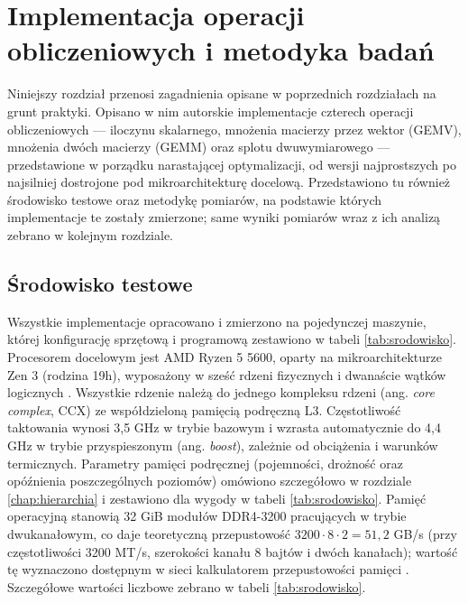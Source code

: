 \documentclass[a4paper,12pt]{book} %
\begin{document}
\chapter{Implementacja operacji obliczeniowych i metodyka badań}
\label{chap:implementacja}

Niniejszy rozdział przenosi zagadnienia opisane w poprzednich rozdziałach na grunt praktyki. Opisano w nim autorskie implementacje czterech operacji obliczeniowych --- iloczynu skalarnego, mnożenia macierzy przez wektor (GEMV), mnożenia dwóch macierzy (GEMM) oraz splotu dwuwymiarowego --- przedstawione w porządku narastającej optymalizacji, od wersji najprostszych po najsilniej dostrojone pod mikroarchitekturę docelową. Przedstawiono tu również środowisko testowe oraz metodykę pomiarów, na podstawie których implementacje te zostały zmierzone; same wyniki pomiarów wraz z ich analizą zebrano w kolejnym rozdziale.

\section{Środowisko testowe}
\label{sec:srodowisko}

Wszystkie implementacje opracowano i zmierzono na pojedynczej maszynie, której konfigurację sprzętową i programową zestawiono w tabeli \ref{tab:srodowisko}. Procesorem docelowym jest AMD Ryzen 5 5600, oparty na mikroarchitekturze Zen 3 (rodzina 19h), wyposażony w sześć rdzeni fizycznych i dwanaście wątków logicznych \cite{evers2022zen3}. Wszystkie rdzenie należą do jednego kompleksu rdzeni (ang. \emph{core complex}, CCX) ze współdzieloną pamięcią podręczną L3. Częstotliwość taktowania wynosi 3,5 GHz w trybie bazowym i wzrasta automatycznie do 4,4 GHz w trybie przyspieszonym (ang. \emph{boost}), zależnie od obciążenia i warunków termicznych. Parametry pamięci podręcznej (pojemności, drożność oraz opóźnienia poszczególnych poziomów) omówiono szczegółowo w rozdziale \ref{chap:hierarchia} i zestawiono dla wygody w tabeli \ref{tab:srodowisko}. Pamięć operacyjną stanowią 32 GiB modułów DDR4-3200 pracujących w trybie dwukanałowym, co daje teoretyczną przepustowość $3200 \cdot 8 \cdot 2 = 51{,}2$ GB/s (przy częstotliwości 3200 MT/s, szerokości kanału 8 bajtów i dwóch kanałach); wartość tę wyznaczono dostępnym w sieci kalkulatorem przepustowości pamięci \cite{finlaydag33k_ramcalc}. Szczegółowe wartości liczbowe zebrano w tabeli \ref{tab:srodowisko}.
\end{document}
